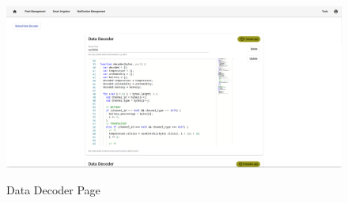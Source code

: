 \begin{figure}[H]
   \centering
   \resizebox{\columnwidth}{!}
   {
      \includegraphics{assets/figures/ui/decoder.png}
   }
   \caption[Data Processor Page]{Data Decoder Page}
   \label{fig:AppendixD:decoder}
\end{figure}

